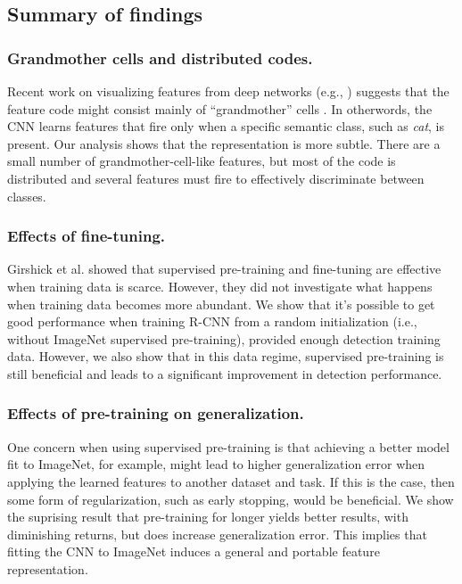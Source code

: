 
\subsection{Summary of findings}

\subsubsection{Grandmother cells and distributed codes.}
Recent work on visualizing features from deep networks (e.g., \cite{GoogleCat,DeConv}) suggests that the feature code might consist mainly of ``grandmother'' cells \cite{Barlow,Grandmother}.
In otherwords, the CNN learns features that fire only when a specific semantic class, such as \emph{cat}, is present.
Our analysis shows that the representation is more subtle.
There are a small number of grandmother-cell-like features, but most of the code is distributed and several features must fire to effectively discriminate between classes.

\subsubsection{Effects of fine-tuning.} 
Girshick et al. \cite{Rcnn} showed that supervised pre-training and fine-tuning are effective when training data is scarce.
However, they did not investigate what happens when training data becomes more abundant.
We show that it's possible to get good performance when training R-CNN from a random initialization (i.e., without ImageNet supervised pre-training), provided enough detection training data.
However, we also show that in this data regime, supervised pre-training is still beneficial and leads to a significant improvement in detection performance.

\subsubsection{Effects of pre-training on generalization.}
One concern when using supervised pre-training is that achieving a better model fit to ImageNet, for example, might lead to higher generalization error when applying the learned features to another dataset and task.
If this is the case, then some form of regularization, such as early stopping, would be beneficial.
We show the suprising result that pre-training for longer yields better results, with diminishing returns, but does increase generalization error.
This implies that fitting the CNN to ImageNet induces a general and portable feature representation.


